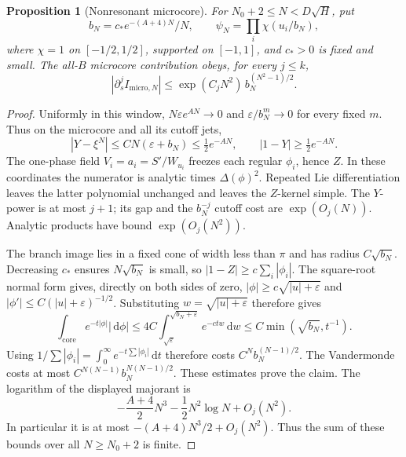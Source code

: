 \documentclass[11pt]{article}
\numberwithin{equation}{section}
\newtheorem{proposition}[theorem]{Proposition}
\theoremstyle{definition}
\newcommand{\dd}{\,\mathrm d}
\newcommand{\eps}{\varepsilon}
\begin{document}
\begin{proposition}[Nonresonant microcore]\label{prop:micro}
For \(N_0+2\le N<D\sqrt H\), put
\[
 b_N=c_*e^{-(A+4)N}/N,\qquad
 \psi_N=\prod_i\chi(u_i/b_N),
\]
where \(\chi=1\) on \([-1/2,1/2]\), supported on \([-1,1]\), and
\(c_*>0\) is fixed and small. The all-\(B\) microcore contribution
obeys, for every \(j\le k\),
\[
 |\partial_s^j I_{\mathrm{micro},N}|
 \le \exp(C_jN^2)\,b_N^{(N^2-1)/2}.
\]
\end{proposition}
\begin{proof}
Uniformly in this window,
\(N\eps e^{AN}\to0\) and \(\eps/b_N^m\to0\) for every fixed \(m\).
Thus on the microcore and all its cutoff jets,
\[
 |Y-\xi^N|\le CN(\eps+b_N)\le\tfrac12e^{-AN},
 \qquad |1-Y|\ge\tfrac12e^{-AN}.
\]
The one-phase field \(V_i=a_i=S'/W_{u_i}\) freezes each regular
\(\phi_i\), hence \(Z\). In these coordinates the numerator is
analytic times \(\Delta(\phi)^2\).
Repeated Lie differentiation leaves the latter polynomial unchanged
and leaves the \(Z\)-kernel simple. The \(Y\)-power is at most
\(j+1\); its gap and the \(b_N^{-j}\) cutoff cost are
\(\exp(O_j(N))\). Analytic products have bound \(\exp(O_j(N^2))\).

The branch image lies in a fixed cone of width less than \(\pi\)
and has radius \(C\sqrt{b_N}\). Decreasing \(c_*\) ensures
\(N\sqrt{b_N}\) is small, so
\(|1-Z|\ge c\sum_i|\phi_i|\).
The square-root normal form gives, directly on both sides of zero,
\(|\phi|\ge c\sqrt{|u|+\eps}\) and
\(|\phi'|\le C(|u|+\eps)^{-1/2}\). Substituting
\(w=\sqrt{|u|+\eps}\) therefore gives
\[
 \int_{\mathrm{core}}e^{-t|\phi|}|\dd\phi|
       \le4C\int_{\sqrt\eps}^{\sqrt{b_N+\eps}}e^{-ctw}\dd w
       \le C\min(\sqrt{b_N},t^{-1}).
\]
Using \(1/\sum|\phi_i|=\int_0^\infty e^{-t\sum|\phi_i|}\dd t\)
therefore costs \(C^N b_N^{(N-1)/2}\).
The Vandermonde costs at most
\(C^{N(N-1)}b_N^{N(N-1)/2}\). These estimates prove the claim.
The logarithm of the displayed majorant is
\[
 -\frac{A+4}{2}N^3-\frac12N^2\log N+O_j(N^2).
\]
In particular it is at most \(-(A+4)N^3/2+O_j(N^2)\).
Thus the sum of these bounds over all \(N\ge N_0+2\) is finite.
\end{proof}
\end{document}
